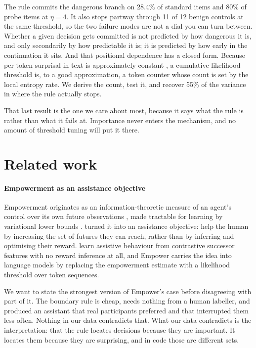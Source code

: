 \documentclass[10pt]{article}
\begin{document}
The rule commits the dangerous branch on 28.4\% of standard items and 80\% of probe items at
$\eta = 4$. It also stops partway through 11 of 12 benign controls at the same threshold, so the
two failure modes are not a dial you can turn between. Whether a given decision gets committed is
not predicted by how dangerous it is, and only secondarily by how predictable it is; it is
predicted by how early in the continuation it sits. And that positional dependence has a closed
form. Because per-token surprisal in text is approximately constant \citep{genzel2002,jaeger2010},
a cumulative-likelihood threshold is, to a good approximation, a token counter whose count is set
by the local entropy rate. We derive the count, test it, and recover 55\% of the variance in where
the rule actually stops.

That last result is the one we care about most, because it says what the rule is rather than what
it fails at. Importance never enters the mechanism, and no amount of threshold tuning will put it
there.

\section{Related work}

\paragraph{Empowerment as an assistance objective}
Empowerment originates as an information-theoretic measure of an agent's control over its own
future observations \citep{klyubin2005,salge2014}, made tractable for learning by variational
lower bounds \citep{mohamed2015}. \citet{du2020} turned it into an assistance objective: help the
human by increasing the set of futures they can reach, rather than by inferring and optimising
their reward. \citet{myers2024} learn assistive behaviour from contrastive successor features with
no reward inference at all, and Empower \citep{ellis2025} carries the idea into language models by
replacing the empowerment estimate with a likelihood threshold over token sequences.

We want to state the strongest version of Empower's case before disagreeing with part of it. The
boundary rule is cheap, needs nothing from a human labeller, and produced an assistant that real
participants preferred and that interrupted them less often. Nothing in our data contradicts that.
What our data contradicts is the interpretation: that the rule locates decisions because they are
important. It locates them because they are surprising, and in code those are different sets.
\end{document}
